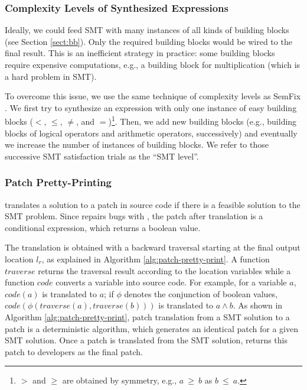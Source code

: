 \subsubsection{Complexity Levels of Synthesized Expressions}
\label{sec:smt-level}

Ideally, we could feed SMT with many instances of all kinds of building blocks (see Section \ref{sect:bb}). 
Only the required building blocks would be wired to the final result.
This is an inefficient strategy in practice: some building blocks require expensive computations, e.g., a building block for multiplication (which is a hard problem in SMT).

To overcome this issue, we use the same technique of complexity levels as SemFix \cite{nguyen2013semfix}.
We first try to synthesize an expression with only one instance of easy building blocks ($<$, $\leq$, $\neq$, and $=$)\footnote{$>$ and $\geq$ are obtained by symmetry, e.g., $a~\geq~b$ as $b~\leq~a$.}.
Then, we add new building blocks (e.g., building blocks of logical operators and arithmetic operators, successively) and eventually we increase the number of instances of building blocks. We refer to those successive SMT satisfaction trials as the ``SMT level''.

\subsubsection{Patch Pretty-Printing}
\label{subsubsect:patch-print}

\nopol translates a solution to a patch in source code if there is a feasible solution to the SMT problem. Since \nopol repairs bugs with \buggyandpres, the patch after translation is a conditional expression, which returns a boolean value. 

The translation is obtained with a backward traversal starting at the final output location $l_r$, as explained in Algorithm \ref{alg:patch-pretty-print}. A function $traverse$ returns the traversal result according to the location variables while a function $code$ converts a variable into source code. For example, for a variable $a$, $code(a)$ is translated to $a$; if $\phi$ denotes the conjunction of boolean values, $code(\phi(traverse(a),traverse(b)))$ is translated to $a \wedge b$. As shown in Algorithm \ref{alg:patch-pretty-print}, patch translation from a SMT solution to a patch is a deterministic algorithm, which generates an identical patch for a given SMT solution. Once a patch is translated from the SMT solution, \nopol returns this patch to developers as the final patch.   

